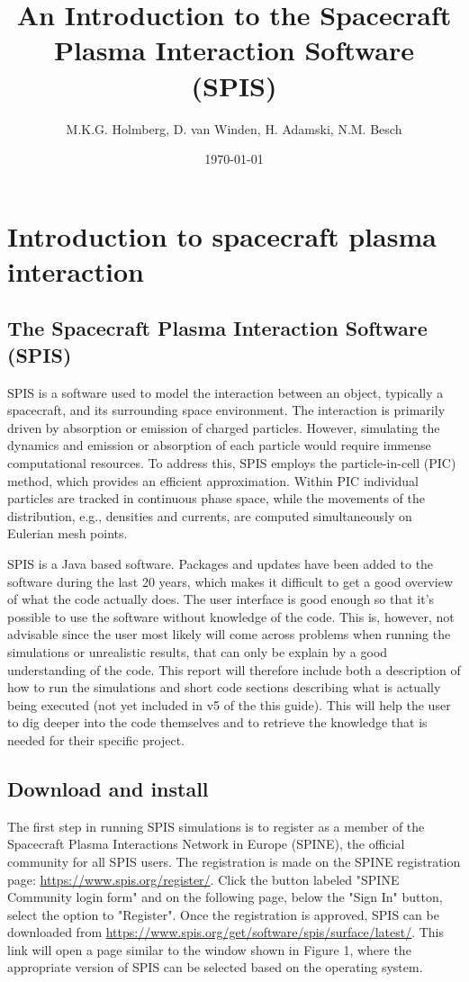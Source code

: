 \documentclass[a4paper, 11pt]{article}
\title{An Introduction to the Spacecraft Plasma Interaction Software (SPIS)}
\date{\today}
\author{M.K.G. Holmberg, D. van Winden, H. Adamski, N.M. Besch}
\begin{document}
\maketitle

\tableofcontents
\newpage

\section{Introduction to spacecraft plasma interaction}

\subsection{The Spacecraft Plasma Interaction Software (SPIS)}

SPIS is a software used to model the interaction between an object, typically a spacecraft, and its surrounding space environment. The interaction is primarily driven by absorption or emission of charged particles. However, simulating the dynamics and emission or absorption of each particle would require immense computational resources. To address this, SPIS employs the particle-in-cell (PIC) method, which provides an efficient approximation. Within PIC individual particles are tracked in continuous phase space, while the movements of the distribution, e.g., densities and currents, are computed simultaneously on Eulerian mesh points.\par
SPIS is a Java based software. Packages and updates have been added to the software during the last 20 years, which makes it difficult to get a good overview of what the code actually does. The user interface is good enough so that it's possible to use the software without knowledge of the code. This is, however, not advisable since the user most likely will come across problems when running the simulations or unrealistic results, that can only be explain by a good understanding of the code. This report will therefore include both a description of how to run the simulations and short code sections describing what is actually being executed (not yet included in v5 of the this guide). This will help the user to dig deeper into the code themselves and to retrieve the knowledge that is needed for their specific project.

\subsection{Download and install}

The first step in running SPIS simulations is to register as a member of the  Spacecraft Plasma Interactions Network in Europe (SPINE), the official community for all SPIS users. The registration is made on the SPINE registration page: \url{https://www.spis.org/register/}. Click the button labeled "SPINE Community login form" and on the following page, below the "Sign In" button, select the option to "Register".  Once the registration is approved, SPIS can be downloaded from \url{https://www.spis.org/get/software/spis/surface/latest/}. This link will open a page similar to the window shown in Figure 1, where the appropriate version of SPIS can be selected based on the operating system.
\end{document}
